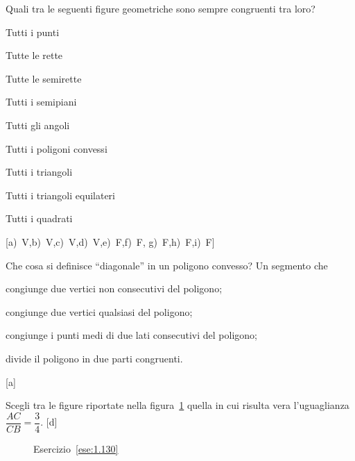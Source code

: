 \begin{esercizio}
\label{ese:1.128}
Quali tra le seguenti figure geometriche sono sempre congruenti tra 
loro?
\begin{multicols}{2}
\begin{enumeratea}
\item Tutti i punti				
\tab\tab\boxV\quad\boxF
\item Tutte le rette				
\tab\tab\boxV\quad\boxF
\item Tutte le semirette				
\tab\boxV\quad\boxF
\item Tutti i semipiani				\tab\boxV\quad\boxF
\item Tutti gli angoli			\tab\tab\boxV\quad\boxF
\item Tutti i poligoni convessi		\tab\boxV\quad\boxF
\item Tutti i triangoli			\tab\tab\boxV\quad\boxF
\item Tutti i triangoli equilateri	\tab\boxV\quad\boxF
\item Tutti i quadrati			\tab\tab\boxV\quad\boxF
\end{enumeratea}
\end{multicols}
\hfill[a)~V,\quad b)~V,\quad c)~V,\quad d)~V,\quad e)~F,\quad f)~F,\quad 
g)~F,\quad h)~F,\quad i)~F]
\end{esercizio}


\begin{esercizio}
\label{ese:1.129}
Che cosa si definisce ``diagonale'' in un poligono convesso? Un 
segmento che
\begin{enumeratea}
\item congiunge due vertici non consecutivi del poligono;
\item congiunge due vertici qualsiasi del poligono;
\item congiunge i punti medi di due lati consecutivi del poligono;
\item divide il poligono in due parti congruenti.
\end{enumeratea}
\hfill[a]
\end{esercizio}

	
\begin{esercizio}
\label{ese:1.130}
Scegli tra le figure riportate nella figura~\ref{fig:ese1.130} quella 
in cui risulta vera l'uguaglianza $\dfrac{AC}{CB}=\dfrac{3}{4}$.
\hfill[d]
\end{esercizio}


\begin{inaccessibleblock}
 \begin{figure}[htb]
 \centering
 \caption{Esercizio~\ref{ese:1.130}}\label{fig:ese1.130}
\end{figure}
\end{inaccessibleblock}

